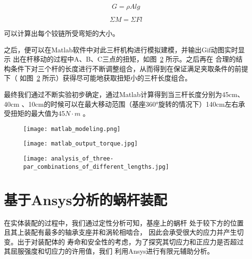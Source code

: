   \begin{equation}
    G= \rho Alg
  \end{equation}

  \begin{equation}
    \Sigma M=\Sigma Fl
  \end{equation}
  
  {\songti 可以计算出每个铰链所受弯矩的大小。}



  {\songti 之后，便可以在Matlab软件中对此三杆机构进行模拟建模，并输出Gif动图实时显示
  出在杆移动的过程中A、B、C三点的扭矩，如图~\ref{fig:Matlab输出扭矩} 所示。之后再在
  合理的结构条件下对三个杆的长度进行不断调整组合，从而得到在保证满足夹取条件的前提下（
  如图~\ref{fig:Matlab输出扭矩} 所示）获得尽可能地获取扭矩小的三杆长度组合。}

  {\songti 最终我们通过不断实验初步确定，通过Matlab计算得到当三杆长度分别为45cm、40cm
  、10cm的时候可以在最大移动范围（基座360°旋转的情况下）140cm左右承受扭矩的最大值为45$N\cdot{m}$ 。

  \begin{figure}[!htp]
    \centering
    \texttt{[image: matlab\_modeling.png]}
    \label{fig:matlab建模}
  \end{figure}

  \begin{figure}[!htp]
    \centering
    \texttt{[image: matlab\_output\_torque.jpg]}
    \label{fig:Matlab输出扭矩}
  \end{figure}

  \begin{figure}[!htp]
    \centering
    \texttt{[image: analysis\_of\_three-par\_combinations\_of\_different\_lengths.jpg]}
    \label{fig:不同长度三杆组合分析}
  \end{figure}


\section{基于Ansys分析的蜗杆装配}

  {\songti 在实体装配的过程中，我们通过定性分析可知，基座上的蜗杆
  处于较下方的位置且其上装配有最多的轴承支座并和涡轮相啮合，
  因此会承受很大的应力并产生切变。出于对装配体的
  寿命和安全性的考虑，为了探究其切应力和正应力是否超过其屈服强度和切应力的许用值，我们
  利用Ansys进行有限元辅助分析。}
  
}
